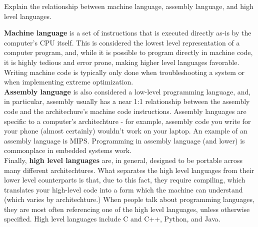 Explain the relationship between machine language, assembly language, and high level languages.\\
\begin{answer}
\small{\textbf{Machine language} is a set of instructions that is executed directly as-is by the computer's CPU itself. This is considered the lowest level representation of a computer program, and, while it is possible to program directly in machine code, it is highly tedious and error prone, making higher level languages favorable. Writing machine code is typically only done when troubleshooting a system or when implementing extreme optimization.\\
\textbf{Assembly language} is also considered a low-level programming language, and, in particular, assembly usually has a near 1:1 relationship between the assembly code and the architechure's machine code instructions. Assembly languages are specific to a computer's architechture - for example, assembly code you write for your phone (almost certainly) wouldn't work on your laptop. An example of an assembly language is MIPS. Programming in assembly language (and lower) is commonplace in embedded systems work.
\\
Finally, \textbf{high level languages} are, in general, designed to be portable across many different architechtures. What separates the high level languages from their lower level counterparts is that, due to this fact, they require compiling, which translates your high-level code into a form which the machine can understand (which varies by architechture.) When people talk about programming languages, they are most often referencing one of the high level languages, unless otherwise specified. High level languages include C and C++, Python, and Java.}
\end{answer}
